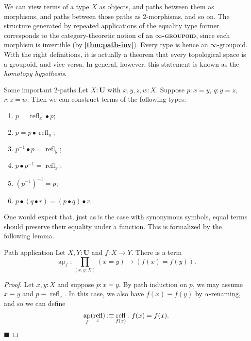 \documentclass{article}
\newcommand{\defn}[1]{{\scshape\bfseries\color{MPBemph}#1}}
\renewcommand{\qed}{\hfill{\color{MPBthm}\( \blacksquare \)}}
\newcommand{\eql}{\mathbin{:\equiv}}
\newcommand{\U}{\mathbf{U}}
\newcommand{\tpi}[1]{\prod_{(#1)}}
\newcommand{\1}{\textbf{1}}
\newcommand{\0}{\mathbf{0}}
\newcommand{\2}{\textbf{2}}
\DeclareMathOperator{\refl}{refl}
\DeclareMathOperator{\ap}{ap}
\begin{document}
We can view terms of a type \( X \) as objects, and paths between them as morphisms, and paths between those paths as 2-morphisms, and so on. The structure generated by repeated applications of the equality type former corresponds to the category-theoretic notion of an \defn{\( \infty \)-groupoid}, since each morphism is invertible (by \textbf{\color{MPBthm}\ref{thm:path-inv}}). Every type is hence an \( \infty \)-groupoid. With the right definitions, it is actually a theorem that every topological space is a groupoid, and vice versa. In general, however, this statement is known as the \emph{homotopy hypothesis}.
\begin{thm}{Some important 2-paths}{} Let \( X : \U \) with \( x, y, z, w : X \). Suppose \( p : x = y \), \( q : y = z \), \( r : z = w \). Then we can construct terms of the following types:
\begin{enumerate}
	\item \( p = {\refl_{x}} \bullet p \);
	\item \( p = p \bullet {\refl_{y}} \);
	\item \( p^{-1} \bullet p = \refl_{y} \);
	\item \( p \bullet p^{-1} = \refl_{x} \);
	\item \( (p^{-1})^{-1} = p \);
	\item \( p \bullet (q \bullet r) = (p \bullet q) \bullet r \).
\end{enumerate} \end{thm}
One would expect that, just as is the case with synonymous symbols, equal terms should preserve their equality under a function. This is formalized by the following lemma.
\begin{thm}{Path application}{} Let \( X, Y : \U \) and \( f : X \to Y \). There is a term
\[ \ap_{f} : \tpi{x, y : X} (x = y) \to (f(x) = f(y)). \]
\begin{proof}
	Let \( x, y : X \) and suppose \( p : x = y \). By path induction on \( p \), we may assume \( x \equiv y \) and \( p \equiv \refl_{x} \). In this case, we also have \( f(x) \equiv f(y) \) by \( \alpha \)-renaming, and so we can define
	\[ \ap_{f}(\refl_{x}) \eql \refl_{f(x)} : f(x) = f(x).\vspace{-18pt} \] \qed\vspace{3pt}
\end{proof} \end{thm}
\end{document}
